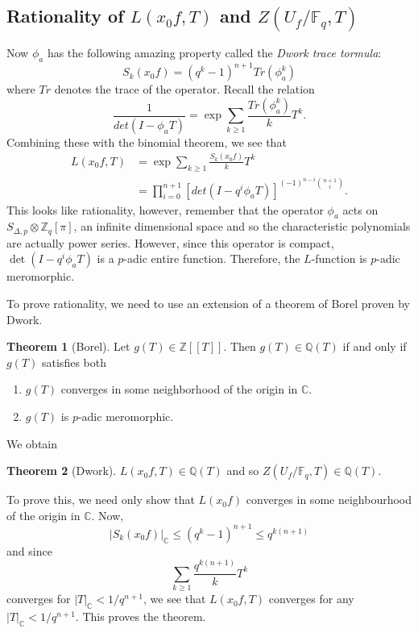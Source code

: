 \documentclass[a4paper,oneside,11pt]{article}
\theoremstyle{plain} \theoremstyle{definition}
\newtheorem{Thm}{Theorem}[section]
\theoremstyle{remark}
\def\bb #1{ {\mathbb #1} }
\def\sd { S_{\Delta, p} }
\begin{document}
\subsection{Rationality of $L(x_0f,T)$ and $Z(U_f/\bb F_q,
T)$} \label{Ss: rationality} Now $\phi_a$ has the following
amazing property called the \emph{Dwork trace tormula}:
\[
S_k(x_0 f) = (q^k - 1)^{n+1} Tr(\phi_a^k)
\]
where $Tr$ denotes the trace of the operator. Recall the relation
\[
\frac{1}{det(I - \phi_a T)} = \exp \sum_{k \geq 1} \frac{
Tr(\phi_a^k)}{k}{T^k}.
\]
Combining these with the binomial theorem, we see that
\begin{align*}
L(x_0 f, T) &= \exp \sum_{k \geq 1} \frac{S_k(x_0 f)}{k} T^k
\\
&= \prod_{i=0}^{n+1} \left[ det(I - q^i \phi_a T)
\right]^{(-1)^{n-i} \binom{n+1}{i}}.
\end{align*}
This looks like rationality, however, remember that the operator
$\phi_a$ acts on $\sd \otimes \bb Z_q[\pi]$, an infinite
dimensional space and so the characteristic polynomials are
actually power series. However, since this operator is compact,
$\det(I - q^i \phi_a T)$ is a $p$-adic entire function. Therefore,
the $L$-function is $p$-adic meromorphic.

To prove rationality, we need to use an extension of a theorem of
Borel proven by Dwork.
\begin{Thm}[Borel]
Let $g(T) \in \bb Z[[T]]$. Then $g(T) \in \bb Q(T)$ if and only if
$g(T)$ satisfies both
\begin{enumerate}
\item $g(T)$ converges in some neighborhood of the origin in
${\bb C}$. \item $g(T)$ is $p$-adic meromorphic.
\end{enumerate}
\end{Thm}

We obtain
\begin{Thm}[Dwork]
$L(x_0 f, T) \in \bb Q(T)$ and so $Z(U_f / \bb F_q, T) \in \bb
Q(T)$.
\end{Thm}
To prove this, we need only show that $L(x_0 f)$ converges in
some neighbourhood of the origin in ${\bb C}$. Now,
\[
|S_k(x_0 f)|_{\bb C} \leq (q^k - 1)^{n+1} \leq q^{k(n+1)}
\]
and since
\[
\sum_{k \geq 1} \frac{q^{k(n+1)}}{k} T^k
\]
converges for $|T|_{\bb C} < 1/q^{n+1}$, we see that $L(x_0 f,
T)$ converges for any $|T|_{\bb C} < 1/q^{n+1}$. This proves the
theorem.
\end{document}
